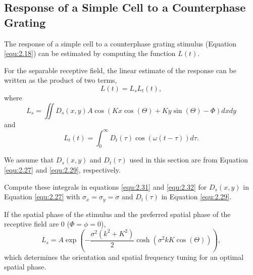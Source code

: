 \subsection{Response of a Simple Cell to a Counterphase Grating}
\label{sec:ResponseOfSimpleCelltoCounterphaseGrating}

\begin{rem}
  The response of a simple cell to a counterphase grating stimulus (Equation \ref{equ:2.18}) can be estimated by computing the function $L(t)$.
\end{rem}

\begin{prop}
  For the separable receptive field, the linear estimate of the response can be written as the product of two terms,
  \begin{equation}
    \label{equ:2.30}
    L(t) = L_sL_t(t),
  \end{equation}
  where
  \begin{equation}
    \label{equ:2.31}
    L_s = \iint D_s(x,y)A\cos\left( Kx\cos(\Theta)+Ky\sin(\Theta)-\Phi\right) dxdy
  \end{equation}
  and
  \begin{equation}
    \label{equ:2.32}
    L_t(t) = \int_0^{\infty}D_t(\tau)\cos(\omega(t-\tau))d\tau.
  \end{equation}
\end{prop}

\begin{asm}
  We assume that $D_s(x,y)$ and $D_t(\tau)$ used in this section are from Equation \ref{equ:2.27} and \ref{equ:2.29}, respectively.
\end{asm}

\begin{exc}
  Compute these integrals in equations \ref{equ:2.31} and \ref{equ:2.32} for $D_s(x,y)$ in Equation \ref{equ:2.27} with $\sigma_x = \sigma_y = \sigma$ and $D_t(\tau)$ in Equation \ref{equ:2.29}.
\end{exc}

\begin{prop}
  If the spatial phase of the stimulus and the preferred spatial phase of the receptive field are 0 ($\Phi = \phi = 0$),
  \begin{equation}
    \label{equ:2.33}
    L_s = A\exp\left(-\frac{\sigma^2(k^2+K^2)}{2}\cosh(\sigma^2kK\cos(\Theta))\right),
  \end{equation}
  which determines the orientation and spatial frequency tuning for an
optimal spatial phase.
\end{prop}

